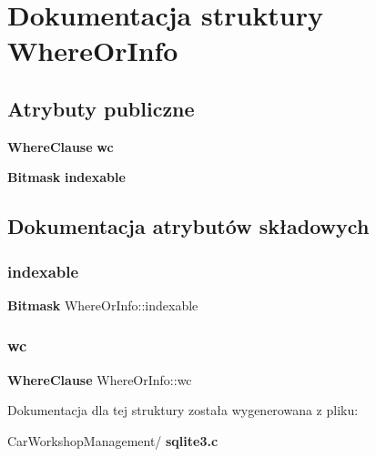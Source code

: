\section{Dokumentacja struktury Where\+Or\+Info}
\label{struct_where_or_info}
\subsection*{Atrybuty publiczne}
\begin{DoxyCompactItemize}
\item 
\textbf{ Where\+Clause} \textbf{ wc}
\item 
\textbf{ Bitmask} \textbf{ indexable}
\end{DoxyCompactItemize}


\subsection{Dokumentacja atrybutów składowych}
\mbox{\label{struct_where_or_info_a39777f291e1e516f01b05b71a9805357}} 
\subsubsection{indexable}
{\footnotesize\ttfamily \textbf{ Bitmask} Where\+Or\+Info\+::indexable}

\mbox{\label{struct_where_or_info_a45bb04e5ea24ec549f060bc8b210ec71}} 
\subsubsection{wc}
{\footnotesize\ttfamily \textbf{ Where\+Clause} Where\+Or\+Info\+::wc}



Dokumentacja dla tej struktury została wygenerowana z pliku\+:\begin{DoxyCompactItemize}
\item 
Car\+Workshop\+Management/\textbf{ sqlite3.\+c}\end{DoxyCompactItemize}
